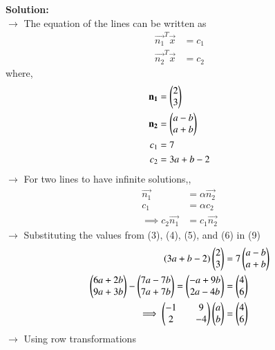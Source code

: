 \documentclass[journal]{IEEEtran}
\begin{document}
\textbf{Solution:}\\
$\rightarrow$ The equation of the lines can be written as
\begin{align}
    \vec{n_1}^{T}\vec{x} &= c_1 \\
    \vec{n_2}^{T}\vec{x} &= c_2
\end{align}
\hspace{0.3cm} where,
\begin{align}
    \mathbf{n_1} &= \begin{pmatrix}2\\3\end{pmatrix} \\
    \mathbf{n_2} &= \begin{pmatrix}a-b\\a+b\end{pmatrix} \\
    c_1 &= 7 \\
    c_2 &= 3a + b -2
\end{align}
$\rightarrow$ For two lines to have infinite solutions,,
\begin{align}
    \vec{n_1} &= \alpha \vec{n_2} \\
    c_1 &= \alpha c_2 \\
    \implies c_2 \vec{n_1} &= c_1 \vec{n_2}
\end{align}
$\rightarrow$ Substituting the values from (3), (4), (5), and (6) in (9)
\begin{align}
    (3a + b - 2)\begin{pmatrix}2\\3\end{pmatrix} &= 7 \begin{pmatrix}a-b\\a+b\end{pmatrix} \\
    \begin{pmatrix}6a + 2b\\9a + 3b\end{pmatrix} - \begin{pmatrix}7a-7b\\7a+7b\end{pmatrix} = \begin{pmatrix}-a + 9b\\2a - 4b\end{pmatrix} &= \begin{pmatrix}4\\6\end{pmatrix} \\
    \implies \begin{pmatrix}-1&&9\\2&&-4\end{pmatrix}\begin{pmatrix}a\\b\end{pmatrix} &= \begin{pmatrix}4\\6\end{pmatrix}
\end{align}
$\rightarrow$ Using row transformations
\end{document}
